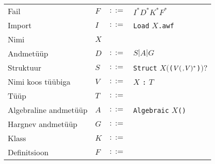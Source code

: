 \documentclass[12pt]{article}
\begin{document}
      \begin{tabular}{llll}
        Fail                  & $F$ & $::=$ & $I^*D^*K^*F^*$                                                                                                 \\
        Import                & $I$ & $::=$ & {\color{hall}\verb!Load!} $X${\color{hall}\verb!.awf!}                                                         \\
        Nimi                  & $X$ &       &                                                                                                                \\
        Andmetüüp             & $D$ & $::=$ & $S|A|G$                                                                                                        \\
        Struktuur             & $S$ & $::=$ & {\color{hall}\verb!Struct!} $X(${\color{hall}\verb!(!}$V({\color{hall}\verb!,!}V)^*${\color{hall}\verb!)!}$)?$ \\
        Nimi koos tüübiga     & $V$ & $::=$ & $X$ {\color{hall}\verb!:!} $T$                                                                                 \\
        Tüüp                  & $T$ & $::=$ &  \\
        Algebraline andmetüüp & $A$ & $::=$ & {\color{hall}\verb!Algebraic!} $X${\color{hall}\verb!(!}{\color{hall}\verb!)!} \\
        Hargnev andmetüüp     & $G$ & $::=$ &  \\
        Klass                 & $K$ & $::=$ &  \\
        Definitsioon          & $F$ & $::=$ & 
      \end{tabular}
\end{document}
